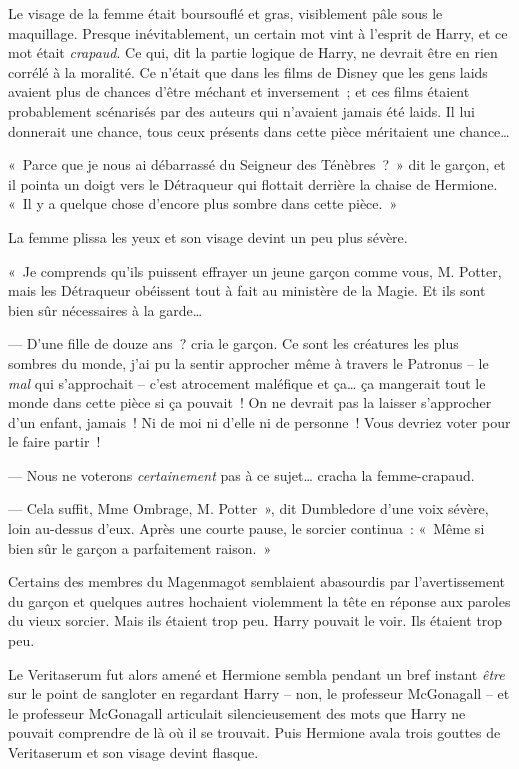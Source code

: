 Le visage de la femme était boursouflé et gras, visiblement pâle sous le maquillage.
Presque inévitablement, un certain mot vint à l'esprit de Harry, et ce mot était \emph{crapaud}.
Ce qui, dit la partie logique de Harry, ne devrait être en rien corrélé à la moralité.
Ce n'était que dans les films de Disney que les gens laids avaient plus de chances d'être méchant et inversement~; et ces films étaient probablement scénarisés par des auteurs qui n'avaient jamais été laids.
Il lui donnerait une chance, tous ceux présents dans cette pièce méritaient une chance…

«~Parce que je nous ai débarrassé du Seigneur des Ténèbres~?~»
dit le garçon, et il pointa un doigt vers le Détraqueur qui flottait derrière la chaise de Hermione.
«~Il y a quelque chose d'encore plus sombre dans cette pièce.~»

La femme plissa les yeux et son visage devint un peu plus sévère.

«~Je comprends qu'ils puissent effrayer un jeune garçon comme vous, M. Potter, mais les Détraqueur obéissent tout à fait au ministère de la Magie.
Et ils sont bien sûr nécessaires à la garde…

--- D'une fille de douze ans~? cria le garçon.
Ce sont les créatures les plus sombres du monde, j'ai pu la sentir approcher même à travers le Patronus -- le \emph{mal} qui s'approchait -- c'est atrocement maléfique et ça… ça mangerait tout le monde dans cette pièce si ça pouvait~!
On ne devrait pas la laisser s'approcher d'un enfant, jamais~!
Ni de moi ni d'elle ni de personne~!
Vous devriez voter pour le faire partir~!

--- Nous ne voterons \emph{certainement} pas à ce sujet… cracha la femme-crapaud.

--- Cela suffit, Mme Ombrage, M. Potter~», dit Dumbledore d'une voix sévère, loin au-dessus d'eux.
Après une courte pause, le sorcier continua~: «~Même si bien sûr le garçon a parfaitement raison.~»

Certains des membres du Magenmagot semblaient abasourdis par l'avertissement du garçon et quelques autres hochaient violemment la tête en réponse aux paroles du vieux sorcier.
Mais ils étaient trop peu.
Harry pouvait le voir.
Ils étaient trop peu.

Le Veritaserum fut alors amené et Hermione sembla pendant un bref instant \emph{être} sur le point de sangloter en regardant Harry -- non, le professeur McGonagall -- et le professeur McGonagall articulait silencieusement des mots que Harry ne pouvait comprendre de là où il se trouvait.
Puis Hermione avala trois gouttes de Veritaserum et son visage devint flasque.

